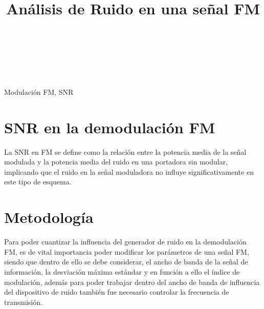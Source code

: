 \documentclass[conference]{IEEEtran}
\begin{document}
	
	\title{Análisis de Ruido en una señal FM}
	\author{
		\\
		\\
		\\
		\and
		\and
		\and
	}
	
	\maketitle
	\begin{abstract}
		
	\end{abstract}
	
	\begin{IEEEkeywords}
		Modulación FM, SNR
	\end{IEEEkeywords}
	
	\section{ SNR en la demodulación FM}
	
	La SNR en FM se define como la relación entre la potencia media de la señal modulada y la potencia media del ruido en una portadora sin modular, implicando que el ruido en la señal moduladora no influye significativamente en este tipo de esquema.
	
	
	
	\section{ Metodología }
	Para poder cuantizar la influencia del generador de ruido en la demodulación FM, es de vital importancia poder modificar los parámetros de una señal FM, siendo que dentro de ello se debe considerar, el ancho de banda de la señal de información, la desviación máxima estándar y en función a ello el índice de modulación, además para poder trabajar dentro del ancho de banda de influencia del dispositivo de ruido también fue necesario controlar la frecuencia de transmisión.
	
\end{document}
